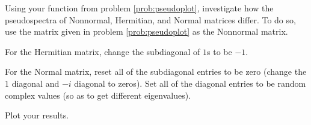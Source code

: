 \begin{problem}
Using your function from problem \ref{prob:pseudoplot}, investigate how the pseudospectra of Nonnormal, Hermitian, and Normal matrices differ.  To do so, use the matrix given in problem \ref{prob:pseudoplot} as the Nonnormal matrix.  

For the Hermitian matrix, change the subdiagonal of $1$s to be $-1$.  

For the Normal matrix, reset all of the subdiagonal entries to be zero (change the $1$ diagonal and $-i$ diagonal to zeros).  Set all of the diagonal entries to be random complex values (so as to get different eigenvalues).

Plot your results.
\end{problem} 


